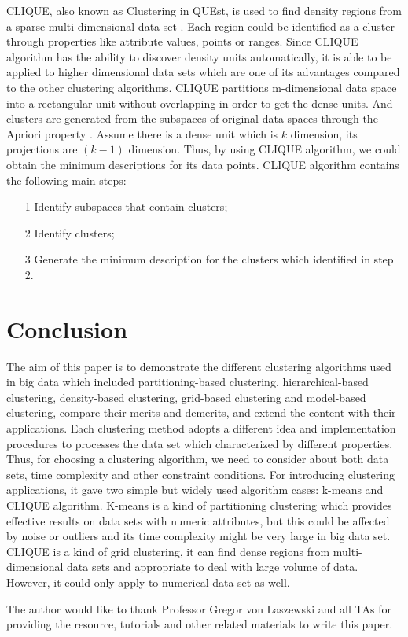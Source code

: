 \documentclass[sigconf]{acmart}
\begin{document}
CLIQUE, also known as Clustering in QUEst, is used to find density regions from a sparse multi-dimensional data set \cite{bdca}. Each region could be identified as a cluster through properties like attribute values, points or ranges. Since CLIQUE algorithm has the ability to discover density units automatically, it is able to be applied to higher dimensional data sets which are one of its advantages compared to the other clustering algorithms. CLIQUE partitions m-dimensional data space into a rectangular unit without overlapping in order to get the dense units. And clusters are generated from the subspaces of original data spaces through the Apriori property \cite{bdca}. Assume there is a dense unit which is $k$ dimension, its projections are $(k-1)$ dimension. Thus, by using CLIQUE algorithm, we could obtain the minimum descriptions for its data points. CLIQUE algorithm contains the following main steps:
\begin{itemize}
\item[1] Identify subspaces that contain clusters;
\item[2] Identify clusters;
\item[3] Generate the minimum description for the clusters which identified in step 2.
\end{itemize}

\section{Conclusion}

The aim of this paper is to demonstrate the different clustering algorithms used in big data which included partitioning-based clustering, hierarchical-based clustering, density-based clustering, grid-based clustering and model-based clustering, compare their merits and demerits, and extend the content with their applications. Each clustering method adopts a different idea and implementation procedures to processes the data set which characterized by different properties. Thus, for choosing a clustering algorithm, we need to consider about both data sets, time complexity and other constraint conditions. For introducing clustering applications, it gave two simple but widely used algorithm cases: k-means and CLIQUE algorithm. K-means is a kind of partitioning clustering which provides effective results on data sets with numeric attributes, but this could be affected by noise or outliers and its time complexity might be very large in big data set. CLIQUE is a kind of grid clustering, it can find dense regions from multi-dimensional data sets and appropriate to deal with large volume of data. However, it could only apply to numerical data set as well.

\begin{acks}

The author would like to thank Professor Gregor von Laszewski and all TAs for providing the resource, tutorials and other related materials to write this paper.

\end{acks}




% 
\end{document}
